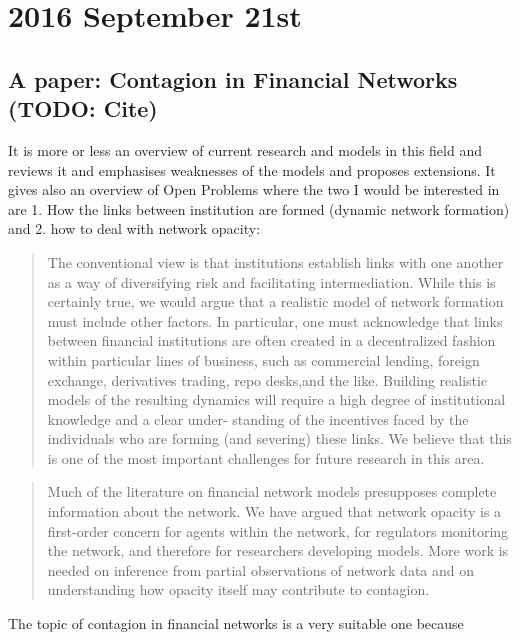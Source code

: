 \section*{2016 September 21st}

\subsection*{A paper: Contagion in Financial Networks (TODO: Cite)}
It is more or less an overview of current research and models in this field and reviews it and emphasises weaknesses of the models and proposes extensions. It gives also an overview of Open Problems where the two I would be interested in are 1. How the links between institution are formed (dynamic network formation) and 2. how to deal with network opacity:

\begin{quote}
The conventional view is that institutions establish links with one another as a way of diversifying risk and facilitating intermediation. While this is certainly true, we would argue that a realistic model of network formation must include other factors. In particular, one must acknowledge that links between financial institutions are often created in a decentralized fashion within particular lines of business, such as commercial lending, foreign exchange, derivatives trading, repo desks,and the like. Building realistic models of the resulting dynamics will require a high degree of institutional knowledge and a clear under- standing of the incentives faced by the individuals who are forming (and severing) these links. We believe that this is one of the most important challenges for future research in this area.
\end{quote}

\begin{quote}
Much of the literature on financial network models presupposes complete information about the network. We have argued that network opacity is a first-order concern for agents within the network, for regulators monitoring the network, and therefore for researchers developing models. More work is needed on inference from partial observations of network data and on understanding how opacity itself may contribute to contagion.
\end{quote}

The topic of contagion in financial networks is a very suitable one because

